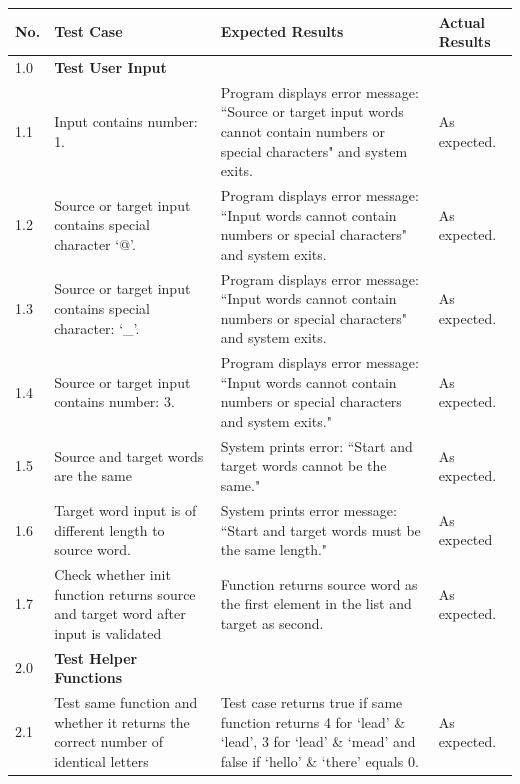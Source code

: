 \documentclass[12pt, a4]{report}
\begin{document}
		\begin{tabular}{ |p{0.5cm}|p{5cm}|p{5cm}|p{5cm}| }
			\hline
			No. & Test Case & Expected Results & Actual Results \\
			\hline
			1.0 & \textbf{Test User Input} &  & \\
			1.1 & Input contains number: 1. & Program displays error message: ``Source or target input words cannot contain numbers or special characters" and system exits. & As expected.\\
			1.2 & Source or target input contains special character `@'. & Program displays error message: ``Input words cannot contain numbers or special characters" and system exits. & As expected. \\
			1.3 & Source or target input contains special character: `\_'. & Program displays error message: ``Input words cannot contain numbers or special characters" and system exits. & As expected. \\
			1.4 & Source or target input contains number: 3. & Program displays error message: ``Input words cannot contain numbers or special characters and system exits." & As expected. \\
			1.5 & Source and target words are the same & System prints error: ``Start and target words cannot be the same." & As expected. \\
			1.6 & Target word input is of different length to source word. & System prints error message: ``Start and target words must be the same length." & As expected \\
			1.7 & Check whether init function returns source and target word after input is validated & Function returns source word as the first element in the list and target as second. & As expected.\\
			2.0 & \textbf{Test Helper Functions} &  &  \\
			2.1 & Test same function and whether it returns the correct number of identical letters & Test case returns true if same function returns 4 for `lead' \& `lead', 3 for `lead' \& `mead' and false if `hello' \& `there' equals 0. & As expected. \\
			\hline
		\end{tabular}

			\pagebreak[4]
			
\end{document}
